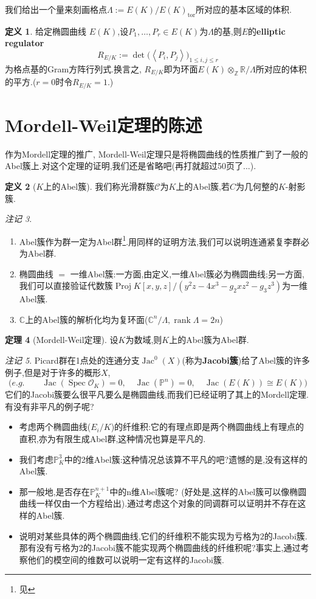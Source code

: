 \documentclass[12pt,A4paper,oneside,reqno]{amsart}
\numberwithin{equation}{section}
\theoremstyle{definition}
\newtheorem{theorem}{定理}[section]
\newtheorem{defn}[theorem]{定义}
\theoremstyle{plain}
\theoremstyle{plain}
\numberwithin{equation}{section}
\theoremstyle{remark}
\newtheorem{remark}[theorem]{注记}
\newtheorem{remarks}[theorem]{注记}
\DeclareMathOperator{\Proj}{\operatorname{Proj}}
\DeclareMathOperator{\rank}{\operatorname{rank}}
\DeclareMathOperator{\tor}{\operatorname{tor}}
\newcommand{\Spec}{\operatorname{Spec}}
\newcommand{\Jac}{\operatorname{Jac}}
\begin{document}
我们给出一个量来刻画格点$\Lambda:=E(K)/E(K)_{\tor}$所对应的基本区域的体积.
\begin{defn}
	给定椭圆曲线 $E(K)$,设$P_1, \ldots ,P_r \in E(K)$为$\Lambda$的基,则$E$的\textbf{elliptic regulator}
	$$R_{E/K}:=\det \big(\left<P_i,P_j\right>\big)_{1 \leqslant i,j \leqslant r}$$
	为格点基的Gram方阵行列式.换言之, $R_{E/K}$即为环面$E(K)\otimes_{\mathbb{Z}}\mathbb{R}/\Lambda$所对应的体积的平方.($r=0$时令$R_{E/K}=1$.)
\end{defn}
\section{Mordell-Weil定理的陈述}
作为Mordell定理的推广, Mordell-Weil定理只是将椭圆曲线的性质推广到了一般的Abel簇上.对这个定理的证明,我们还是省略吧(再打就超过50页了...).
\begin{defn}[$K$上的Abel簇]
	我们称光滑群簇$\mathcal{C}$为$K$上的Abel簇,若$C$为几何整的$K$-射影簇.
\end{defn}
\begin{remarks}\
	\begin{enumerate}[1.]
		\item Abel簇作为群一定为Abel群\footnote{见\cite[p295-297,10.3.F]{vakil2017rising}}.用同样的证明方法,我们可以说明连通紧复李群必为Abel群.
		\item 椭圆曲线 $=$ 一维Abel簇:一方面,由定义,一维Abel簇必为椭圆曲线;另一方面,我们可以直接验证代数簇$\Proj K[x,y,z]/(y^2z-4x^3-g_2xz^2-g_3z^3)$为一维Abel簇.
		\item $\mathbb{C}$上的Abel簇的解析化均为复环面($\mathbb{C}^n/\Lambda, \rank \Lambda =2n$)
	\end{enumerate}
\end{remarks}
\begin{theorem}[Mordell-Weil定理]
	设$K$为数域,则$K$上的Abel簇为Abel群.
\end{theorem}
\begin{remark}
	Picard群在1点处的连通分支$\Jac^0(X)$(称为\textbf{Jacobi簇})给了Abel簇的许多例子,但是对于许多的概形$X$,
	$$\big(e.g.\qquad\Jac(\Spec \mathcal{O}_K)=0,\quad\Jac(\mathbb{P}^n)=0,\quad\Jac(E(K))\cong E(K)\big)$$
	它们的Jacobi簇要么很平凡要么是椭圆曲线,而我们已经证明了其上的Mordell定理.有没有非平凡的例子呢?
	\begin{itemize}
		\item 考虑两个椭圆曲线($E_i/K$)的纤维积:它的有理点即是两个椭圆曲线上有理点的直积,亦为有限生成Abel群,这种情况也算是平凡的.
		\item 我们考虑$\mathbb{P}_K^3$中的2维Abel簇:这种情况总该算不平凡的吧?遗憾的是,没有这样的Abel簇.
		\item 那一般地,是否存在$\mathbb{P}_K^{n+1}$中的n维Abel簇呢? (好处是,这样的Abel簇可以像椭圆曲线一样仅由一个方程给出).通过考虑这个对象的同调群可以证明并不存在这样的Abel簇.
		\item \cite{kani2014jacobians}说明对某些具体的两个椭圆曲线,它们的纤维积不能实现为亏格为$2$的Jacobi簇.那有没有亏格为$2$的Jacobi簇不能实现两个椭圆曲线的纤维积呢?事实上,通过考察他们的模空间的维数可以说明一定有这样的Jacobi簇.
	\end{itemize}
\end{remark}
\end{document}
